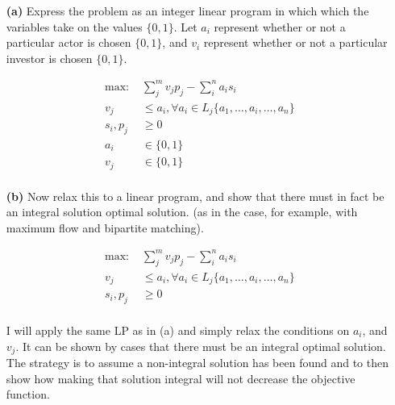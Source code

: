 \documentclass[11pt]{article}
\begin{document}
\begin{itemize}
  \item[{\bf (a)}] Express the problem as an integer linear program in which 
    which the variables take on the values $\{0,1\}$. Let $a_i$ represent
    whether or not a particular actor is chosen $\{0,1\}$, and $v_i$ represent
    whether or not a particular investor is chosen $\{0,1\}$.
    
    \begin{equation*}
      \begin{aligned}
        \mbox{max: } &\sum_{j}^{m}v_jp_j - \sum_{i}^{n}a_is_i\\
        v_j &\leq a_i, \forall a_i\in L_j\{a_1,\ldots,a_i,\ldots,a_n\}\\
        s_i,p_j &\geq 0\\
        a_i&\in\{0,1\}\\
        v_j&\in\{0,1\}\\
      \end{aligned}
    \end{equation*}

  \item[{\bf (b)}] Now relax this to a linear program, and show that there must
    in fact be an integral solution optimal solution. (as in the case, for 
    example, with maximum flow and bipartite matching).

    \begin{equation*}
      \begin{aligned}
        \mbox{max: } &\sum_{j}^{m}v_jp_j - \sum_{i}^{n}a_is_i\\
        v_j &\leq a_i, \forall a_i\in L_j\{a_1,\ldots,a_i,\ldots,a_n\}\\
        s_i,p_j &\geq 0\\
      \end{aligned}
    \end{equation*}

    I will apply the same LP as in (a) and simply relax the conditions on 
    $a_i$, and $v_j$.
    It can be shown by cases that there must be an integral optimal solution. The
    strategy is to assume a non-integral solution has been found and to then
    show how making that solution integral will not decrease the objective function.

    

\end{itemize}
\label{pg:end-of-p2}
%
\end{document}
